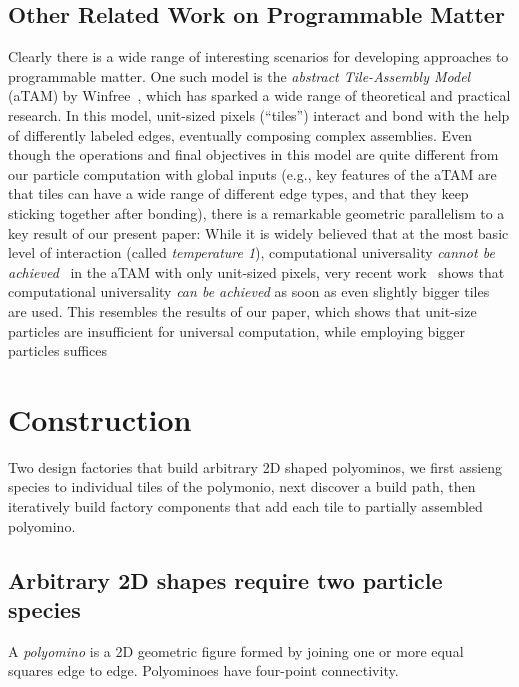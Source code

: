 \documentclass[letterpaper, 10 pt, conference]{ieeeconf}
\begin{document}
\subsection{Other Related Work on Programmable Matter}
Clearly there is a wide range of interesting scenarios for developing approaches to programmable matter.
One such model is the \emph{abstract Tile-Assembly Model} (aTAM) by Winfree~\cite{Winf98,WLWS98,LaWiRe99}, which has 
sparked a wide range of theoretical and practical research. In this model, unit-sized pixels (``tiles'')
interact and bond with the help of differently labeled edges, eventually composing complex assemblies.
Even though the operations and final objectives in this model are quite different from our particle computation with global
inputs (e.g., key features of the aTAM are that tiles can have a wide range of different edge types, and
that they keep sticking together after bonding), there is
a remarkable geometric parallelism to a key result of our present paper:
While it is widely believed that at the most basic level of interaction (called {\em temperature 1}),
computational universality {\em cannot be achieved}~\cite{LSAT1,ManuchTemp1,IUNeedsCoop} in the aTAM with only unit-sized pixels, 
very recent work~\cite{fhp+-ucapt-15} shows that computational universality {\em can be achieved} as soon as even slightly bigger tiles are used. 
This resembles the results of our paper, which shows that unit-size particles are insufficient for universal computation, while employing bigger particles suffices


\section{Construction}\label{sec:Construction}

Two design factories that build arbitrary 2D shaped polyominos, we first assieng species to individual tiles of the polymonio, next discover a build path, then iteratively build factory components that add each tile to partially assembled polyomino.


\subsection{Arbitrary 2D shapes require two particle species}\label{subsec:RobotSpecies}
A \emph{polyomino} is a 2D geometric figure formed by joining one or more equal squares edge to edge. Polyominoes have four-point connectivity.
\end{document}
